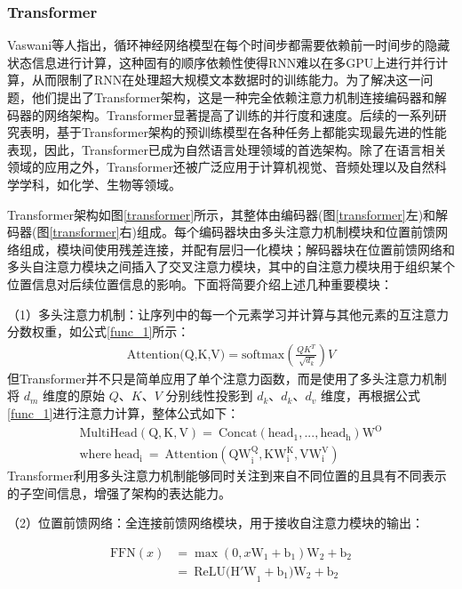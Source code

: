 \documentclass[UTF8,a4paper,12pt]{ctexart}
\numberwithin{equation}{section}
\begin{document}
\subsubsection{Transformer}
Vaswani\cite{ref14}等人指出，循环神经网络模型\cite{14.5}在每个时间步都需要依赖前一时间步的隐藏状态信息进行计算，这种固有的顺序依赖性使得RNN难以在多GPU上进行并行计算，从而限制了RNN在处理超大规模文本数据时的训练能力。为了解决这一问题，他们提出了Transformer架构，这是一种完全依赖注意力机制连接编码器和解码器的网络架构。Transformer显著提高了训练的并行度和速度。后续的一系列研究表明，基于Transformer架构的预训练模型在各种任务上都能实现最先进的性能表现，因此，Transformer已成为自然语言处理领域的首选架构。除了在语言相关领域的应用之外，Transformer还被广泛应用于计算机视觉、音频处理以及自然科学学科，如化学、生物等领域。\par
Transformer\cite{ref14.7}架构如图\ref{transformer}所示，其整体由编码器(图\ref{transformer}左)和解码器(图\ref{transformer}右)组成。每个编码器块由多头注意力机制模块和位置前馈网络组成，模块间使用残差连接，并配有层归一化模块；解码器块在位置前馈网络和多头自注意力模块之间插入了交叉注意力模块，其中的自注意力模块用于组织某个位置信息对后续位置信息的影响。下面将简要介绍上述几种重要模块：\par
（1）多头注意力机制：让序列中的每一个元素学习并计算与其他元素的互注意力分数权重，如公式\ref{func_1}所示：
\begin{eqnarray}
	\text{Attention(Q,K,V)} =  \text{softmax}(\frac{QK^T}{\sqrt[]{d_k}})V
	\label{func_1}
\end{eqnarray}
但Transformer并不只是简单应用了单个注意力函数，而是使用了多头注意力机制将 \(d_m\) 维度的原始 \(Q\)、\(K\)、\(V\) 分别线性投影到 \(d_k\)、\(d_k\)、\(d_v\) 维度，再根据公式\ref{func_1}进行注意力计算，整体公式如下：
\begin{eqnarray}
	\mathrm{MultiHead(Q,K,V)=~Concat(head_{1},...,head_{h})W^{O}} \\
	\mathrm{where~head_{i}~=~Attention(QW_{i}^{Q},KW_{i}^{K},VW_{i}^{V})}
	\label{func_2}
\end{eqnarray}
Transformer利用多头注意力机制能够同时关注到来自不同位置的且具有不同表示的子空间信息，增强了架构的表达能力。\par
（2）位置前馈网络：全连接前馈网络模块，用于接收自注意力模块的输出：\par
\begin{eqnarray}
	\mathrm{FFN}(x) & =\max(0,x\mathrm{W}_1+\mathrm{b}_1)\mathrm{W}_2+\mathrm{b}_2 \\
	& =\mathrm{~ReLU(H'W}_1+\mathrm{b}_1)\mathrm{W}_2+\mathrm{b}_2
	\label{func_3}
\end{eqnarray}
\end{document}
